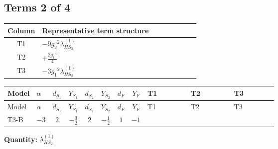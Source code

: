 \documentclass[8pt]{article}
\begin{document}
\begin{landscape}
\subsection*{Terms 2 of 4}
\begin{center}
\begin{tabular}{@{}c >{\raggedright\arraybackslash}p{0.82\linewidth}@{}}
\toprule
Column & Representative term structure \\
\midrule
T1 & \(\displaystyle -9 {g_2}^2 {\lambda_{HS_2}^{(1)}}\) \\
\midrule
T2 & \(\displaystyle +\frac{3 {g_1}^4}{4}\) \\
\midrule
T3 & \(\displaystyle -3 {g_1}^2 {\lambda_{HS_2}^{(1)}}\) \\
\midrule
\bottomrule
\end{tabular}
\end{center}
\smallskip
\tiny
\begin{longtable}{@{}llcccccc >{\raggedright\arraybackslash}p{0.21\linewidth} >{\raggedright\arraybackslash}p{0.21\linewidth} >{\raggedright\arraybackslash}p{0.21\linewidth}@{}}
\toprule
Model & $\alpha$ & $d_{S_1}$ & $Y_{S_1}$ & $d_{S_2}$ & $Y_{S_2}$ & $d_F$ & $Y_F$ & T1 & T2 & T3 \\
\midrule
\endfirsthead
\toprule
Model & $\alpha$ & $d_{S_1}$ & $Y_{S_1}$ & $d_{S_2}$ & $Y_{S_2}$ & $d_F$ & $Y_F$ & T1 & T2 & T3 \\
\midrule
\endhead
T3-B & $-3$ & $2$ & $-\frac{3}{2}$ & $2$ & $-\frac{1}{2}$ & $1$ & $-1$ & \scriptsize\adjustbox{max width=\linewidth}{$\begin{gathered} -9 {g_2}^2 {\lambda_{HS_2}^{(1)}}\end{gathered}$} & \scriptsize\adjustbox{max width=\linewidth}{$\begin{gathered} +\frac{3 {g_1}^4}{4}\end{gathered}$} & \scriptsize\adjustbox{max width=\linewidth}{$\begin{gathered} -3 {g_1}^2 {\lambda_{HS_2}^{(1)}}\end{gathered}$} \\
\midrule
\bottomrule
\end{longtable}
\clearpage
\noindent\textbf{Quantity: }$\lambda_{HS_2}^{(1)}$\par\smallskip

\end{landscape}
\end{document}
